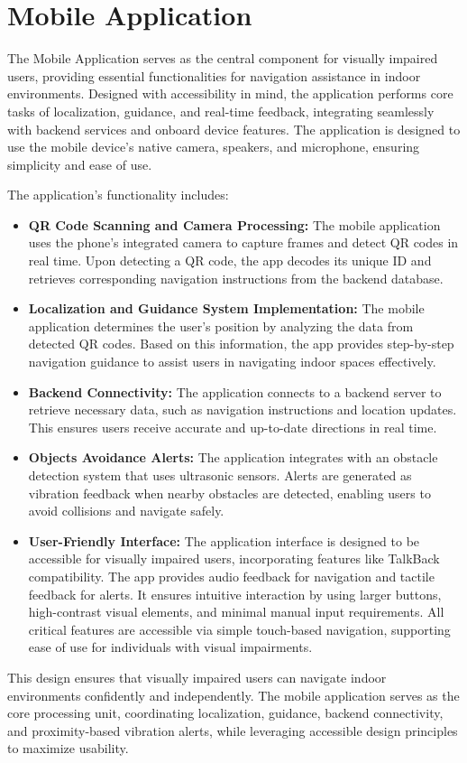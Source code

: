 \section{Mobile Application}

The Mobile Application serves as the central component for visually impaired users, providing essential functionalities for navigation assistance in indoor environments. Designed with accessibility in mind, the application performs core tasks of localization, guidance, and real-time feedback, integrating seamlessly with backend services and onboard device features. The application is designed to use the mobile device's native camera, speakers, and microphone, ensuring simplicity and ease of use.

The application’s functionality includes:

\begin{itemize}
	\item \textbf{QR Code Scanning and Camera Processing:} The mobile application uses the phone's integrated camera to capture frames and detect QR codes in real time. Upon detecting a QR code, the app decodes its unique ID and retrieves corresponding navigation instructions from the backend database.
	
	\item \textbf{Localization and Guidance System Implementation:} The mobile application determines the user’s position by analyzing the data from detected QR codes. Based on this information, the app provides step-by-step navigation guidance to assist users in navigating indoor spaces effectively.
	
	\item \textbf{Backend Connectivity:} The application connects to a backend server to retrieve necessary data, such as navigation instructions and location updates. This ensures users receive accurate and up-to-date directions in real time.
	
	\item \textbf{Objects Avoidance Alerts:} The application integrates with an obstacle detection system that uses ultrasonic sensors. Alerts are generated as vibration feedback when nearby obstacles are detected, enabling users to avoid collisions and navigate safely.
	
	\item \textbf{User-Friendly Interface:} The application interface is designed to be accessible for visually impaired users, incorporating features like TalkBack compatibility. The app provides audio feedback for navigation and tactile feedback for alerts. It ensures intuitive interaction by using larger buttons, high-contrast visual elements, and minimal manual input requirements. All critical features are accessible via simple touch-based navigation, supporting ease of use for individuals with visual impairments.
	
\end{itemize}

This design ensures that visually impaired users can navigate indoor environments confidently and independently. The mobile application serves as the core processing unit, coordinating localization, guidance, backend connectivity, and proximity-based vibration alerts, while leveraging accessible design principles to maximize usability.
